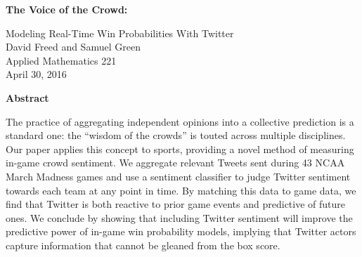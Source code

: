 \documentclass[12pt]{article}
\begin{document}
\renewcommand*{\thefootnote}{\fnsymbol{footnote}}


\begin{titlepage}
\begin{doublespacing}
    \begin{center}
        \vspace*{4cm}
        \Large
        \textbf{The Voice of the Crowd:}
        
        \vspace{0.5cm}
        Modeling Real-Time Win Probabilities With Twitter\\
        \large
        \vspace{1cm}
        David Freed and Samuel Green\\ \vspace{0cm}
        Applied Mathematics 221 \\
        April 30, 2016 \\
       \end{center}
       
       \vspace{3cm}

\end{doublespacing}
\end{titlepage}

\renewcommand*{\thefootnote}{\arabic{footnote}}

\setcounter{page}{1}
\newpage

\begin{doublespacing}

\begin{center}
	\textbf{Abstract} \\
\end{center}
The practice of aggregating independent opinions into a collective prediction is a standard one: the ``wisdom of the crowds'' is touted across multiple disciplines. Our paper applies this concept to sports, providing a novel method of measuring in-game crowd sentiment. We aggregate relevant Tweets sent during 43 NCAA March Madness games and use a sentiment classifier to judge Twitter sentiment towards each team at any point in time. By matching this data to game data, we find that Twitter is both reactive to prior game events and predictive of future ones. We conclude by showing that including Twitter sentiment will improve the predictive power of in-game win probability models, implying that Twitter actors capture information that cannot be gleaned from the box score. 

\end{doublespacing}
	    
\end{document}
